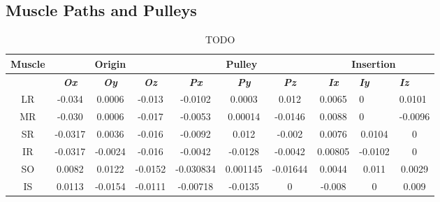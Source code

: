 \documentclass[11pt,a4paper,draft=false]{report}
\begin{document}
\subsection*{Muscle Paths and Pulleys}\label{sec:muscle-modeling}

\begin{table}[h]
  \caption{TODO}\label{tab:muscle-path}
  \begin{tabular}{@{}cccccccccc@{}}
    \toprule
    \textbf{Muscle} & \multicolumn{3}{c}{\textbf{Origin}}                                & \multicolumn{3}{c}{\textbf{Pulley}}                                & \multicolumn{3}{c}{\textbf{Insertion}}                                                                      \\ \midrule
                    & \textit{\textbf{Ox}} & \textit{\textbf{Oy}} & \textit{\textbf{Oz}} & \textit{\textbf{Px}} & \textit{\textbf{Py}} & \textit{\textbf{Pz}} & \textit{\textbf{Ix}} & \multicolumn{1}{l}{\textit{\textbf{Iy}}} & \multicolumn{1}{l}{\textit{\textbf{Iz}}} \\ \midrule
    LR              & -0.034               & 0.0006               & -0.013               & -0.0102              & 0.0003               & 0.012                & 0.0065               & \multicolumn{1}{l}{0}                    & \multicolumn{1}{l}{0.0101}               \\
    MR              & -0.030               & 0.0006               & -0.017               & -0.0053              & 0.00014              & -0.0146              & 0.0088               & \multicolumn{1}{l}{0}                    & \multicolumn{1}{l}{-0.0096}              \\
    SR              & -0.0317              & 0.0036               & -0.016               & -0.0092              & 0.012                & -0.002               & 0.0076               & 0.0104                                   & 0                                        \\
    IR              & -0.0317              & -0.0024              & -0.016               & -0.0042              & -0.0128              & -0.0042              & 0.00805              & -0.0102                                  & 0                                        \\
    SO              & 0.0082               & 0.0122               & -0.0152              & -0.030834            & 0.001145             & -0.01644             & 0.0044               & 0.011                                    & 0.0029                                   \\
    IS              & 0.0113               & -0.0154              & -0.0111
                    & -0.00718             & -0.0135              & 0
                                                                                         &
                                                                                           -0.008
                                                                                                                & 0                                        & 0.009 \\
    \bottomrule
  \end{tabular}
\end{table}
\end{document}
